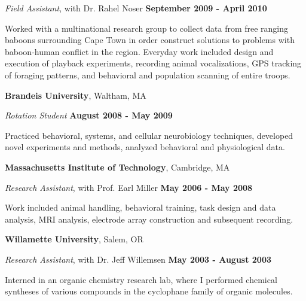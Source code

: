 \documentclass[margin,line]{res}
\begin{document}
\begin{resume}
\vspace{-.3cm}
{\em Field Assistant}, with Dr. Rahel Noser \hfill {\bf September 2009 - April 2010}\\
\vspace{-.5cm}

Worked with a multinational research group to collect data from free ranging baboons surrounding Cape Town in order construct solutions to problems with baboon-human conflict in the region. Everyday work included design and execution of playback experiments, recording animal vocalizations, GPS tracking of foraging patterns, and behavioral and population scanning of entire troops.

\vspace{-.1cm}

{\bf Brandeis University}, Waltham, MA

\vspace{-.3cm}
{\em Rotation Student} \hfill {\bf August 2008 - May 2009}\\
\vspace{-.5cm}

Practiced behavioral, systems, and cellular neurobiology techniques, developed novel experiments and methods, analyzed behavioral and physiological data. 

\vspace{-.1cm}

{\bf Massachusetts Institute of Technology}, Cambridge, MA

\vspace{-.3cm}
{\em Research Assistant}, with Prof. Earl Miller \hfill {\bf May 2006 - May 2008}\\
\vspace{-.5cm}

Work included animal handling, behavioral training, task design and data analysis, MRI analysis, electrode array construction and subsequent recording.

\vspace{-.1cm}

{\bf Willamette University}, Salem, OR

\vspace{-.3cm}
{\em Research Assistant}, with Dr. Jeff Willemsen \hfill {\bf May 2003 - August 2003}\\
\vspace{-.5cm}

Interned in an organic chemistry research lab, where I performed chemical syntheses of various compounds in the cyclophane family of organic molecules. 


\end{resume}
\end{document}
